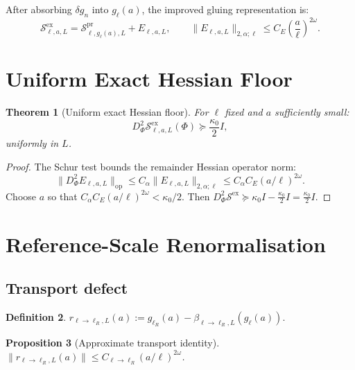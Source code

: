 \documentclass[12pt]{article}
\theoremstyle{plain}
\newtheorem{theorem}{Theorem}[section]
\newtheorem{proposition}[theorem]{Proposition}
\theoremstyle{definition}
\newtheorem{definition}[theorem]{Definition}
\numberwithin{equation}{section}
\newcommand{\pr}{\mathrm{pr}}
\newcommand{\ex}{\mathrm{ex}}
\begin{document}
After absorbing $\delta g_n$ into $g_\ell(a)$, the improved gluing representation is:
\begin{equation}
\boxed{\mathcal{S}^{\ex}_{\ell,a,L} = \mathcal{S}^{\pr}_{\ell,g_\ell(a),L} + E_{\ell,a,L},\qquad
\|E_{\ell,a,L}\|_{2,\alpha;\ell} \leq C_E\left(\frac{a}{\ell}\right)^{2\omega}.}
\end{equation}


\section{Uniform Exact Hessian Floor}\label{sec:hessianfloor}

\begin{theorem}[Uniform exact Hessian floor]\label{thm:exacthessianfloor}
For $\ell$ fixed and $a$ sufficiently small:
\begin{equation}
D_\Phi^2\mathcal{S}^{\ex}_{\ell,a,L}(\Phi) \succeq \frac{\kappa_0}{2}I,
\end{equation}
uniformly in $L$.
\end{theorem}

\begin{proof}
The Schur test bounds the remainder Hessian operator norm:
\begin{equation}
\|D_\Phi^2 E_{\ell,a,L}\|_{\mathrm{op}} \leq C_\alpha\|E_{\ell,a,L}\|_{2,\alpha;\ell} \leq C_\alpha C_E(a/\ell)^{2\omega}.
\end{equation}
Choose $a$ so that $C_\alpha C_E(a/\ell)^{2\omega}<\kappa_0/2$.  Then $D_\Phi^2\mathcal{S}^{\ex}\succeq\kappa_0 I-\frac{\kappa_0}{2}I=\frac{\kappa_0}{2}I$.
\end{proof}


\section{Reference-Scale Renormalisation}\label{sec:refscale}

\subsection{Transport defect}

\begin{definition}
$r_{\ell\to\ell_R,L}(a):=g_{\ell_R}(a)-\beta_{\ell\to\ell_R,L}(g_\ell(a))$.
\end{definition}

\begin{proposition}[Approximate transport identity]\label{prop:transportdefect}
$\|r_{\ell\to\ell_R,L}(a)\|\leq C_{\ell\to\ell_R}(a/\ell)^{2\omega}$.
\end{proposition}
\end{document}
